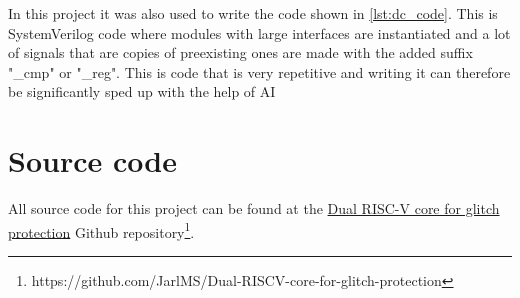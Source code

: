In this project it was also used to write the code shown in \autoref{lst:dc_code}. This is SystemVerilog code where modules with large interfaces are instantiated and a lot of signals that are copies of preexisting ones are made with the added suffix "\_cmp" or "\_reg". This is code that is very repetitive and writing it can therefore be significantly sped up with the help of AI

\section{Source code}

All source code for this project can be found at the \href{https://github.com/JarlMS/Dual-RISCV-core-for-glitch-protection}{Dual RISC-V core for glitch protection} Github repository\footnote{https://github.com/JarlMS/Dual-RISCV-core-for-glitch-protection}.

